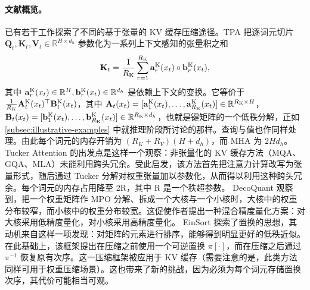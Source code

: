 \documentclass[11pt]{article}
\newcommand{\R}{\mathbb{R}}
\newcommand{\mat}[1]{\mathbf{#1}}
\newcommand{\vecb}[1]{\mathbf{#1}}
\begin{document}



\paragraph{文献概览。} 已有若干工作探索了不同的基于张量的 KV 缓存压缩途径。TPA \cite{zhang2026tpa} 把逐词元切片 $\mat{Q}_t, \mat{K}_t, \mat{V}_t \in \R^{H \times d_h}$ 参数化为一系列上下文感知的张量积之和
\begin{equation}
\mat{K}_t = \frac{1}{R_{\rm K}} \sum_{r=1}^{R_{\rm K}} \vecb{a}_r^{\rm K}(x_t) \circ \vecb{b}_r^{\rm K}(x_t),
\end{equation}
其中 $\vecb{a}_r^{\rm K}(x_t) \in \R^H, \vecb{b}_r^{\rm K}(x_t) \in \R^{d_h}$ 是依赖上下文的变换。它等价于 $\frac{1}{R_K} \mat{A}^{\rm K}_t(x_t)^\top \mat{B}^{\rm K}_t(x_t)$，其中 $\mat{A}_t(x_t) = [\vecb{a}^{\rm K}_1(x_t), \ldots, \vecb{a}^{\rm K}_{R_{\rm K}}(x_t)] \in \R^{R_{\rm K} \times H}$，$\mat{B}_t(x_t) = [\vecb{b}_1^{\rm K}(x_t), \ldots, \vecb{b}_{R_{\rm K}}^{\rm K}(x_t)] \in \R^{R_{\rm K} \times d_h}$，也就是键矩阵的一个低秩分解，正如 \cref{subsec:illustrative-examples} 中就推理阶段所讨论的那样。查询与值也作同样处理。由此每个词元的内存开销为 $(R_K + R_V)(H + d_h)$，而 MHA 为 $2 H d_h$。Tucker Attention \cite{klein2026tuckerattention} 的出发点是这样一个观察：非张量化的 KV 缓存方法（MQA、GQA、MLA）未能利用跨头冗余。受此启发，该方法首先把注意力计算改写为张量形式，随后通过 Tucker 分解对权重张量加以参数化，从而得以利用这种跨头冗余。每个词元的内存占用降至 2R，其中 R 是一个秩超参数。
DecoQuant \cite{liu2024decoquant} 观察到，把一个权重矩阵作 MPO 分解、拆成一个大核与一个小核时，大核中的权重分布较窄，而小核中的权重分布较宽。这促使作者提出一种混合精度量化方案：对大核采用低精度量化，对小核采用高精度量化。
EinSort \cite{koikeakino2026einsort} 探索了置换的思想，其动机来自这样一项发现：对矩阵的元素进行排序，能够得到明显更好的低秩近似。在此基础上，该框架提出在压缩之前使用一个可逆置换 $\pi[\cdot]$，而在压缩之后通过 $\pi^{-1}$ 恢复原有次序。这一压缩框架被应用于 KV 缓存（需要注意的是，此类方法同样可用于权重压缩场景）。这也带来了新的挑战，因为必须为每个词元存储置换次序，其代价可能相当可观。
\end{document}
